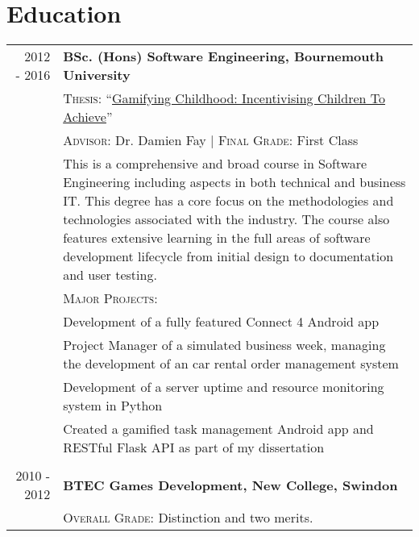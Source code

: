 \section{Education}
\begin{tabular}{r|p{11cm}}
	\ 2012 - 2016 & \textbf{BSc. (Hons) Software Engineering, Bournemouth University}\\ 
	\ & \textsc{Thesis}: ``\href{https://github.com/mikeporterdev/Dissertation/blob/master/digitalmain.pdf}{Gamifying Childhood: Incentivising Children To Achieve}'' \\
	\ & \textsc{Advisor}: Dr. Damien Fay | \normalsize \textsc{Final Grade}: First Class \\
	\ & \footnotesize This is a comprehensive and broad course in Software Engineering including aspects in both technical and business IT. This degree has a core focus on the methodologies and technologies associated with the industry. The course also features extensive learning in the full areas of software development lifecycle from initial design to documentation and user testing. \\
	\ & \vspace{1pt}  \textsc{Major Projects}: \\
	\ & \tabitem Development of a fully featured Connect 4 Android app \\
	\ & \tabitem Project Manager of a simulated business week, managing the development of an car rental order management system \\
	\ &	\tabitem Development of a server uptime and resource monitoring system in Python \\
	\ &	\tabitem Created a gamified task management Android app and RESTful Flask API as part of my dissertation \\

	\multicolumn{2}{c}{} \\


	2010 - 2012 & \textbf{BTEC Games Development, New College, Swindon}\\
	\ & \textsc{Overall Grade}: Distinction and two merits.
\end{tabular}

